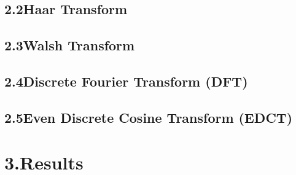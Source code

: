 \documentclass[12pt]{article}
\begin{document}
\subsection*{2.2\quad Haar Transform}


\subsection*{2.3\quad Walsh Transform}


\subsection*{2.4\quad Discrete Fourier Transform (DFT)}


\subsection*{2.5\quad Even Discrete Cosine Transform (EDCT)}



    
\section*{3.\quad Results}
\end{document}
